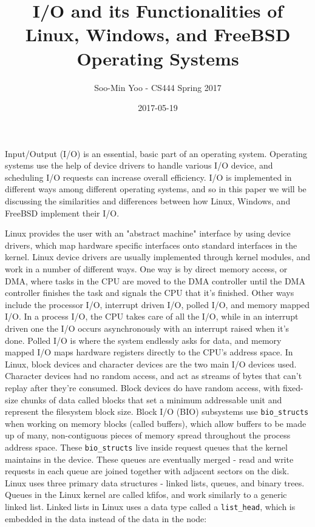 \documentclass[10pt,draftclsnofoot,onecolumn,letterpaper]{IEEEtran}
\begin{document}
\title{I/O and its Functionalities of Linux, Windows, and FreeBSD Operating Systems}
\author{Soo-Min Yoo - CS444 Spring 2017}
\date{2017-05-19}
\maketitle{}


Input/Output (I/O) is an essential, basic part of an operating system. Operating systems use the help of device drivers to handle various I/O device, and scheduling I/O requests can increase overall efficiency. I/O is implemented in different ways among different operating systems, and so in this paper we will be discussing the similarities and differences between how Linux, Windows, and FreeBSD implement their I/O.

Linux provides the user with an "abstract machine" interface by using device drivers, which map hardware specific interfaces onto standard interfaces in the kernel\cite{1}. 
Linux device drivers are usually implemented through kernel modules, and work in a number of different ways. One way is by direct memory access, or DMA, where tasks in the CPU are moved to the DMA controller until the DMA controller finishes the task and signals the CPU that it's finished. Other ways include the processor I/O, interrupt driven I/O, polled I/O, and memory mapped I/O\cite{1}. In a process I/O, the CPU takes care of all the I/O, while in an interrupt driven one the I/O occurs asynchronously with an interrupt raised when it's done. Polled I/O is where the system endlessly asks for data, and memory mapped I/O maps hardware registers directly to the CPU's address space\cite{1}.
In Linux, block devices and character devices are the two main I/O devices used. Character devices had no random access, and act as streams of bytes that can't replay after they're consumed. Block devices do have random access, with fixed-size chunks of data called blocks that set a minimum addressable unit and represent the filesystem block size\cite{1}. Block I/O (BIO) subsystems use \verb!bio_structs! when working on memory blocks (called buffers), which allow buffers to be made up of many, non-contiguous pieces of memory spread throughout the process address space. These \verb!bio_structs! live inside request queues that the kernel maintains in the device. These queues are eventually merged - read and write requests in each queue are joined together with adjacent sectors on the disk\cite{1}.
Linux uses three primary data structures - linked lists, queues, and binary trees. Queues in the Linux kernel are called kfifos, and work similarly to a generic linked list. Linked lists in Linux uses a data type called a \verb!list_head!, which is embedded in the data instead of the data in the node\cite{1}:
\end{document}
